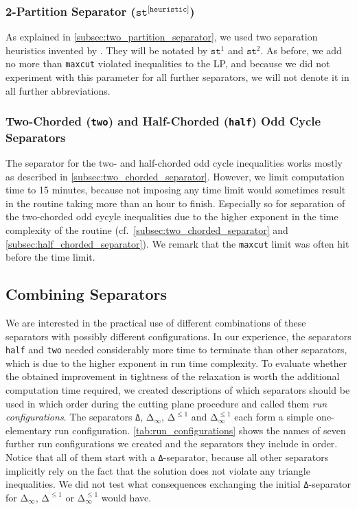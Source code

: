 \subsubsection{2-Partition Separator (\texorpdfstring{$\texttt{st}^{\texttt{[heuristic]}}$}{Δ})}
As explained in \cref{subsec:two_partition_separator}, we used two separation heuristics invented by \cite{grotschelCuttingPlaneAlgorithm1989}.
They will be notated by $\texttt{st}^{1}$ and $\texttt{st}^{2}$.
As before, we add no more than \texttt{maxcut} violated inequalities to the LP, and because we did not experiment with this parameter for all further separators, we will not denote it in all further abbreviations.

\subsubsection{Two-Chorded (\texttt{two}) and Half-Chorded (\texttt{half}) Odd Cycle Separators}
The separator for the two- and half-chorded odd cycle inequalities works mostly as described in \cref{subsec:two_chorded_separator}.
However, we limit computation time to 15 minutes, because not imposing any time limit would sometimes result in the routine taking more than an hour to finish.
Especially so for separation of the two-chorded odd cycyle inequalities due to the higher exponent in the time complexity of the routine (cf.\ \cref{subsec:two_chorded_separator} and \cref{subsec:half_chorded_separator}).
We remark that the \texttt{maxcut} limit was often hit before the time limit.

\subsection{Combining Separators}\label{subsec:run_configurations}
We are interested in the practical use of different combinations of these separators with possibly different configurations.
In our experience, the separators \texttt{half} and \texttt{two} needed considerably more time to terminate than other separators, which is due to the higher exponent in run time complexity.
To evaluate whether the obtained improvement in tightness of the relaxation is worth the additional computation time required,
we created descriptions of which separators should be used in which order during the cutting plane procedure and called them \textit{run configurations}.
The separators \texttt{Δ}, $\texttt{Δ}_{\infty}$, $\texttt{Δ}^{\leq 1}$ and $\texttt{Δ}_{\infty}^{\leq 1}$ each form a simple one-elementary run configuration.
\cref{tab:run_configurations} shows the names of seven further run configurations we created and the separators they include in order.
Notice that all of them start with a \texttt{Δ}-separator, because all other separators implicitly rely on the fact that the solution does not violate any triangle inequalities.
We did not test what consequences exchanging the initial \texttt{Δ}-separator for $\texttt{Δ}_{\infty}$, $\texttt{Δ}^{\leq 1}$ or $\texttt{Δ}_{\infty}^{\leq 1}$ would have.

